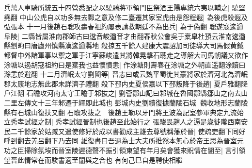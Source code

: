 兵萬人車騎所統五十四營悉配之以驍騎將軍領門臣祭酒王陽專統六夷以輔之|{
	驍堅堯翻}
中山公虎自以功多無去鄴之意及修二臺遷其家室虎由是怨程遐|{
	為後虎殺遐及弘張本}
十一月後趙石聰攻夀春祖約屢表請救朝廷不為出兵|{
	為于偽翻}
聰遂寇逡遒阜陵|{
	二縣皆屬淮南郡師古曰逡音峻遒音才由翻春秋公會吳于槖臯杜預云淮南逡遒縣劉昫曰唐廬州慎縣漢逡遒縣地}
殺掠五千餘人建康大震詔加司徒導大司馬假黄鉞都督中外諸軍事以禦之軍于江寜蘇峻遣其將韓晃擊石聰走之導解大司馬朝議又欲作涂塘以遏胡寇祖約曰是棄我也益懷憤恚|{
	作涂塘則夀春在涂塘之外朝直遥翻涂讀曰滁恚於避翻}
十二月濟岷太守劉闓等|{
	晉志曰或云魏平蜀徙其豪將家於濟河北為濟岷郡太康地志無此郡未詳濟子禮翻}
殺下邳内史夏侯嘉以下邳叛降于後趙|{
	夏戶雅翻降戶江翻}
石瞻攻河南太守王瞻于邾抜之|{
	劉薈鄒山記曰邾城在魯國鄒縣鄒山之南去山二里左傳文十三年邾遷于繹即此城也}
彭城内史劉續復據蘭陵石城|{
	魏收地形志蘭陵縣有石城山復扶又翻}
石瞻攻抜之　後趙王勒以牙門將王波為記室參軍典定九流始立秀孝試經之制|{
	秀孝試經晉制也後趙至此始行之}
張駿畏趙人之逼是歲徙隴西南安民二千餘家於姑臧又遣使修好於成以書勸成主雄去尊號稱藩於晉|{
	使疏吏翻下同好呼到翻去羌呂翻下乃去同}
雄復書曰吾過為士大夫所推然本無心於帝王思為晉室元功之臣掃除氛埃而晉室陵遲德聲不振引領東望有年月矣會獲來貺情在闇至|{
	言引領望晉此情常在而駿書適至闇與之合也}
有何己巳自是聘使相繼

